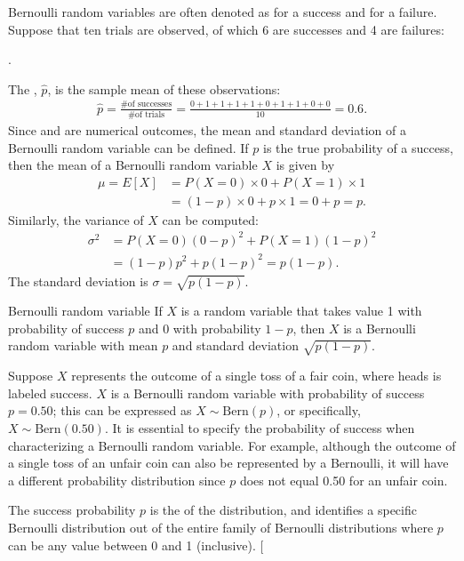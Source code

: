 Bernoulli random variables are often denoted as  for a success and  for a failure. Suppose that ten trials are observed, of which 6 are successes and 4 are failures:
\begin{center}
	         .
\end{center}
The , $\hat{p}$, is the sample mean of these observations:
\begin{eqnarray*}
	\hat{p} = \frac{\text{\# of successes}}{\text{\# of trials}} = \frac{0+1+1+1+1+0+1+1+0+0}{10} = 0.6.
\end{eqnarray*}%
Since  and  are numerical outcomes, the {mean} and {standard deviation} of a Bernoulli random variable can be defined. If ${p}$ is the true probability of a success, then the mean of a Bernoulli random variable $X$ is given by
\begin{align*}
\mu = E[X] &= P(X=0)\times0 + P(X=1)\times1 \\
&= (1-p)\times0 + p\times 1 = 0+p = p.
\end{align*}
Similarly, the variance of $X$ can be computed:
\begin{align*}
\sigma^2 &= {P(X=0)(0-p)^2 + P(X=1)(1-p)^2} \\
&= {(1-p)p^2 + p(1-p)^2} = {p(1-p).}
\end{align*}
The standard deviation is $\sigma=\sqrt{p(1-p)}$.

\textD{\newpage}

\begin{onebox}{Bernoulli random variable}
If $X$ is a random variable that takes value 1 with probability of success $p$ and 0 with probability $1-p$, then $X$ is a Bernoulli random variable with mean $p$ and standard deviation $\sqrt{p(1-p)}$.
\end{onebox}

Suppose $X$ represents the outcome of a single toss of a fair coin, where heads is labeled success. $X$ is a Bernoulli random variable with probability of success $p = 0.50$; this can be expressed as $X \sim \textrm{Bern}(p)$, or specifically, $X \sim \textrm{Bern}(0.50)$. It is essential to specify the probability of success when characterizing a Bernoulli random variable. For example, although the outcome of a single toss of an unfair coin can also be represented by a Bernoulli, it will have a different probability distribution since $p$ does not equal 0.50 for an unfair coin. 

The success probability $p$ is the  of the distribution, and identifies a specific Bernoulli distribution out of the entire family of Bernoulli distributions where $p$ can be any value between 0 and 1 (inclusive). \marginpar[\raggedright\vspace{-12mm}

